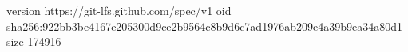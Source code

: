 version https://git-lfs.github.com/spec/v1
oid sha256:922bb3be4167e205300d9ce2b9564c8b9d6c7ad1976ab209e4a39b9ea34a80d1
size 174916
